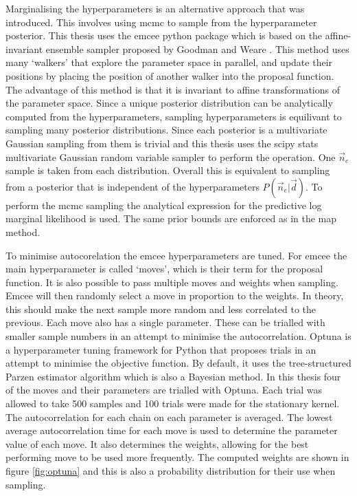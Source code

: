 Marginalising the hyperparameters is an alternative approach that was introduced. This involves using \gls{mcmc} to sample from the hyperparameter posterior. This thesis uses the emcee python package which is based on the affine-invariant ensemble sampler proposed by Goodman and Weare \cite{emceeGoodman}. This method uses many `walkers' that explore the parameter space in parallel, and update their positions by placing the position of another walker into the proposal function. The advantage of this method is that it is invariant to affine transformations of the parameter space. Since a unique posterior distribution can be analytically computed from the hyperparameters, sampling hyperparameters is equilivant to sampling many posterior distributions. Since each posterior is a multivariate Gaussian sampling from them is trivial and this thesis uses the scipy stats multivariate Gaussian random variable sampler to perform the operation. One $\vec n_e$ sample is taken from each distribution. Overall this is equivalent to sampling from a posterior that is independent of the hyperparameters $P(\vec n_e | \vec d)$. To perform the \gls{mcmc} sampling the analytical expression for the predictive log marginal likelihood is used. The same prior bounds are enforced as in the \gls{map} method. 

To minimise autocorelation the emcee hyperparameters are tuned. For emcee the main hyperparameter is called `moves', which is their term for the proposal function. It is also possible to pass multiple moves and weights when sampling. Emcee will then randomly select a move in proportion to the weights. In theory, this should make the next sample more random and less correlated to the previous. Each move also has a single parameter. These can be trialled with smaller sample numbers in an attempt to minimise the autocorrelation. Optuna is a hyperparameter tuning framework for Python that proposes trials in an attempt to minimise the objective function. By default, it uses the tree-structured Parzen estimator algorithm which is also a Bayesian method. In this thesis four of the moves and their parameters are trialled with Optuna. Each trial was allowed to take 500 samples and 100 trials were made for the stationary kernel. The autocorrelation for each chain on each parameter is averaged. The lowest average autocorrelation time for each move is used to determine the parameter value of each move. It also determines the weights, allowing for the best performing move to be used more frequently. The computed weights are shown in figure \ref{fig:optuna} and this is also a probability distribution for their use when sampling.

